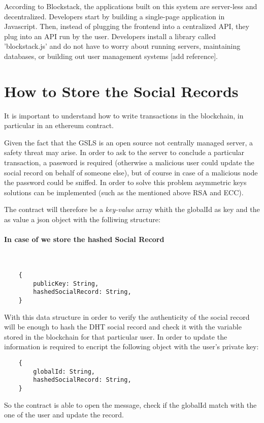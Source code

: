 According to Blockstack, the applications built on this system are server-less and decentralized.
Developers start by building a single-page application in Javascript.
Then, instead of plugging the frontend into a centralized API, they plug into an API run by the user.
Developers install a library called 'blockstack.js' and do not have to worry about running servers, maintaining databases, or building out user management systems [add reference].


\section{How to Store the Social Records}
It is important to understand how to write transactions in the blockchain, in particular in an ethereum contract.

Given the fact that the GSLS is an open source not centrally managed server, a safety threat may arise.
In order to ask to the server to conclude a particular transaction, a password is required (otherwise a malicious user could update the social record on behalf of someone else), but of course in case of a malicious node the password could be sniffed.
In order to solve this problem asymmetric keys solutions can be implemented (such as the mentioned above RSA and ECC).


The contract will therefore be a \textit{key-value} array whith the globalId as key and the as value a json object with the folliwing structure:

\paragraph{In case of we store the hashed Social Record}\
\begin{lstlisting}
	{
		publicKey: String,
		hashedSocialRecord: String,
	}
\end{lstlisting}

With this data structure in order to verify the authenticity of the social record will be enough to hash the DHT social record and check it with the variable stored in the blockchain for that particular user.
In order to update the information is required to encript the following object with the user's private key:

\begin{lstlisting}
	{
		globalId: String,
		hashedSocialRecord: String,
	}
\end{lstlisting}

So the contract is able to open the message, check if the globalId match with the one of the user and update the record.


